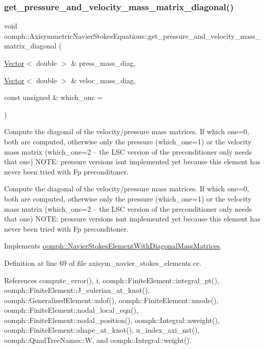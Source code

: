 \subsubsection{\texorpdfstring{get\+\_\+pressure\+\_\+and\+\_\+velocity\+\_\+mass\+\_\+matrix\+\_\+diagonal()}{get\_pressure\_and\_velocity\_mass\_matrix\_diagonal()}}
{\footnotesize\ttfamily void oomph\+::\+Axisymmetric\+Navier\+Stokes\+Equations\+::get\+\_\+pressure\+\_\+and\+\_\+velocity\+\_\+mass\+\_\+matrix\+\_\+diagonal (\begin{DoxyParamCaption}\item[{\hyperlink{classoomph_1_1Vector}{Vector}$<$ double $>$ \&}]{press\+\_\+mass\+\_\+diag,  }\item[{\hyperlink{classoomph_1_1Vector}{Vector}$<$ double $>$ \&}]{veloc\+\_\+mass\+\_\+diag,  }\item[{const unsigned \&}]{which\+\_\+one = {} }\end{DoxyParamCaption})\hspace{0.3cm}{\ttfamily [virtual]}}



Compute the diagonal of the velocity/pressure mass matrices. If which one=0, both are computed, otherwise only the pressure (which\+\_\+one=1) or the velocity mass matrix (which\+\_\+one=2 -- the L\+SC version of the preconditioner only needs that one) N\+O\+TE\+: pressure versions isn\textquotesingle{}t implemented yet because this element has never been tried with Fp preconditoner. 

Compute the diagonal of the velocity/pressure mass matrices. If which one=0, both are computed, otherwise only the pressure (which\+\_\+one=1) or the velocity mass matrix (which\+\_\+one=2 -- the L\+SC version of the preconditioner only needs that one) N\+O\+TE\+: pressure versions isn\textquotesingle{}t implemented yet because this element has never been tried with Fp preconditoner. 

Implements \hyperlink{classoomph_1_1NavierStokesElementWithDiagonalMassMatrices_a4d491d10823eee10381a9b14bce6c244}{oomph\+::\+Navier\+Stokes\+Element\+With\+Diagonal\+Mass\+Matrices}.



Definition at line 69 of file axisym\+\_\+navier\+\_\+stokes\+\_\+elements.\+cc.



References compute\+\_\+error(), i, oomph\+::\+Finite\+Element\+::integral\+\_\+pt(), oomph\+::\+Finite\+Element\+::\+J\+\_\+eulerian\+\_\+at\+\_\+knot(), oomph\+::\+Generalised\+Element\+::ndof(), oomph\+::\+Finite\+Element\+::nnode(), oomph\+::\+Finite\+Element\+::nodal\+\_\+local\+\_\+eqn(), oomph\+::\+Finite\+Element\+::nodal\+\_\+position(), oomph\+::\+Integral\+::nweight(), oomph\+::\+Finite\+Element\+::shape\+\_\+at\+\_\+knot(), u\+\_\+index\+\_\+axi\+\_\+nst(), oomph\+::\+Quad\+Tree\+Names\+::W, and oomph\+::\+Integral\+::weight().



